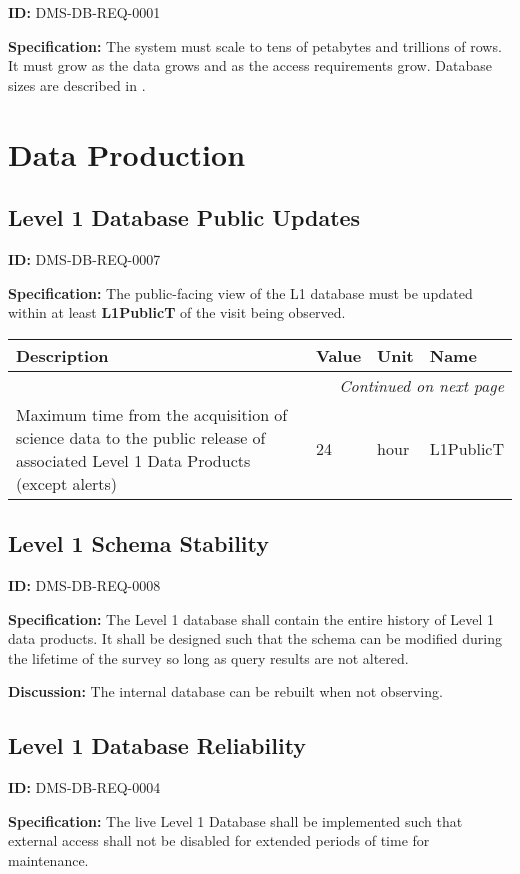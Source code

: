 \documentclass[toc]{lsstdoc}
\makeatletter
\newcommand{\paramname}[1]{\hspace{0pt}#1}
\newcommand{\unitname}[1]{\hspace{0pt}#1}
\newenvironment{parameters}[0]{%
\setlength\LTleft{0pt}
\setlength\LTright{\fill}
\begin{small}
\begin{longtable}[]{|p{0.49\textwidth}|l|p{0.6in}|p{1.70in}@{}|}

\hline \textbf{Description} & \textbf{Value} & \textbf{Unit} & \textbf{Name} \\ \hline
\endhead

\hline \multicolumn{4}{r}{\emph{Continued on next page}} \\
\endfoot

\hline\hline
\endlastfoot
}{%
\hline
\end{longtable}
\end{small}
}
\makeatother
\begin{document}
\label{DMS-DB-REQ-0001}
\textbf{ID:} DMS-DB-REQ-0001

\textbf{Specification:}
The system must scale to tens of petabytes and trillions of rows. It must grow as the data grows and as the access requirements grow. Database sizes are described in .

\section{Data Production}

\subsection{Level 1 Database Public Updates}

\label{DMS-DB-REQ-0007}
\textbf{ID:} DMS-DB-REQ-0007

\textbf{Specification:}
The public-facing view of the L1 database must be updated within at least \textbf{L1PublicT} of the visit being observed.

\begin{parameters}
Maximum time from the acquisition of science data to the public release of associated Level 1 Data Products (except alerts)
&
24
&
\unitname{%
hour
}
&
\paramname{%
L1PublicT
} \\\hline
\end{parameters}

\subsection{Level 1 Schema Stability}

\label{DMS-DB-REQ-0008}
\textbf{ID:} DMS-DB-REQ-0008

\textbf{Specification:}
The Level 1 database shall contain the entire history of Level 1 data products. It shall be designed such that the schema can be modified during the lifetime of the survey so long as query results are not altered.

\textbf{Discussion:}
The internal database can be rebuilt when not observing.

\subsection{Level 1 Database Reliability}

\label{DMS-DB-REQ-0004}
\textbf{ID:} DMS-DB-REQ-0004

\textbf{Specification:}
The live Level 1 Database shall be implemented such that external access shall not be disabled for extended periods of time for maintenance.
\end{document}
